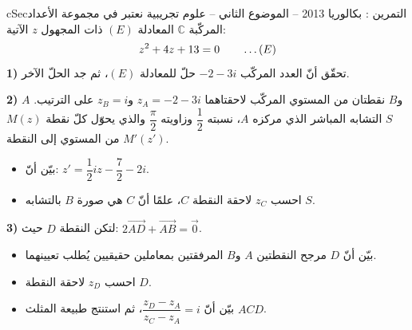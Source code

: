 \documentclass[12pt,a4paper]{article}
\newenvironment{BOX}[2]{\begin{otherlanguage}{english}\begin{arbox}{#1}{#2}}{\end{arbox}\end{otherlanguage}}
\newcounter{exo}
\newenvironment{tamrin}[1]{\stepcounter{exo}\begin{BOX}{cSec}{التمرين \theexo: #1}}{\end{BOX}}
\renewcommand{\ldots}{\mathinner{\ldotp\ldotp\ldotp}}
\newenvironment{sq}{\begin{itemize}[leftmargin=2.4em,itemsep=3pt]}{\end{itemize}}
\newcommand{\qa}{\item[(أ)]}\newcommand{\qb}{\item[(ب)]}\newcommand{\qc}{\item[(جـ)]}\newcommand{\qd}{\item[(د)]}\newcommand{\qe}{\item[(هـ)]}
\begin{document}
\begin{tamrin}{بكالوريا 2013 -- الموضوع الثاني -- علوم تجريبية}
نعتبر في مجموعة الأعداد المركّبة $\mathbb{C}$ المعادلة $(E)$ ذات المجهول $z$ الآتية:
\[z^2+4z+13=0\qquad\ldots(E)\]
\textbf{1)} تحقّق أنّ العدد المركّب $-2-3i$ حلّ للمعادلة $(E)$، ثم جد الحلّ الآخر.

\textbf{2)} $A$ و$B$ نقطتان من المستوي المركّب لاحقتاهما $z_A=-2-3i$ و$z_B=i$ على الترتيب.
$S$ التشابه المباشر الذي مركزه $A$، نسبته $\dfrac12$ وزاويته $\dfrac{\pi}{2}$ والذي يحوّل كلّ نقطة $M(z)$ من المستوي إلى النقطة $M'(z')$.
\begin{sq}
\qa بيّن أنّ: $z'=\dfrac12 iz-\dfrac72-2i$.
\qb احسب $z_C$ لاحقة النقطة $C$، علمًا أنّ $C$ هي صورة $B$ بالتشابه $S$.
\end{sq}
\textbf{3)} لتكن النقطة $D$ حيث: $2\overrightarrow{AD}+\overrightarrow{AB}=\vec 0$.
\begin{sq}
\qa بيّن أنّ $D$ مرجح النقطتين $A$ و$B$ المرفقتين بمعاملين حقيقيين يُطلب تعيينهما.
\qb احسب $z_D$ لاحقة النقطة $D$.
\qc بيّن أنّ $\dfrac{z_D-z_A}{z_C-z_A}=i$، ثم استنتج طبيعة المثلث $ACD$.
\end{sq}
\end{tamrin}
\end{document}
